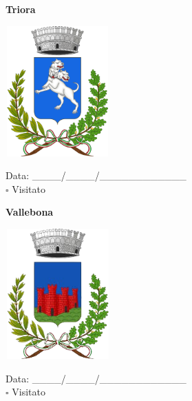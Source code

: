 \documentclass[a5paper,12pt]{article}
\begin{document}
\vspace{0.7cm}

\noindent
\begin{minipage}[t]{0.45\textwidth}
    \begin{center}
        \textbf{Triora}
    \end{center}
    \vspace{-0.5cm} %
    \begin{center}
        \includegraphics[height= 5cm, width=4cm]{Liguria/Stemma Triora.png}
    \end{center}
    \vspace{-0.4cm} %
    \begin{flushleft}
        Data: \_\_\_\_/\_\_\_\_/\_\_\_\_\_\_\_\_\_\_\_\_ \\
        $\square$ Visitato
    \end{flushleft}
\end{minipage}
\hfill
\noindent
\begin{minipage}[t]{0.45\textwidth}
    \begin{center}
        \textbf{Vallebona}
    \end{center}
    \vspace{-0.5cm} %
    \begin{center}
        \includegraphics[height= 5cm, width=4cm]{Liguria/Stemma Vallebona.png}
    \end{center}
    \vspace{-0.4cm} %
    \begin{flushleft}
        Data: \_\_\_\_/\_\_\_\_/\_\_\_\_\_\_\_\_\_\_\_\_ \\
        $\square$ Visitato
    \end{flushleft}
\end{minipage}
\end{document}
